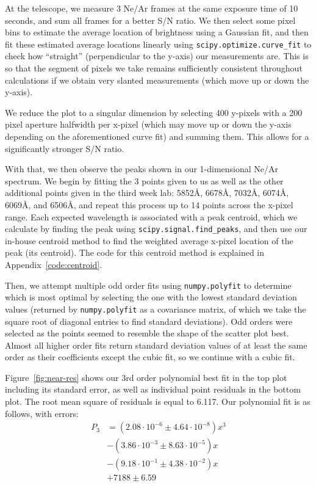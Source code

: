 \documentclass[twocolumn]{aastex702}
\begin{document}
			At the telescope, we measure 3 Ne/Ar frames at the same exposure time of 10 seconds, and sum all frames for a better S/N ratio. We then select some pixel bins to estimate the average location of brightness using a Gaussian fit, and then fit these estimated average locations linearly using \texttt{scipy.optimize.curve\_fit} to check how ``straight'' (perpendicular to the y-axis) our measurements are. This is so that the segment of pixels we take remains sufficiently consistent throughout calculations if we obtain very slanted measurements (which move up or down the y-axis).
			
			We reduce the plot to a singular dimension by selecting 400 y-pixels with a 200 pixel aperture halfwidth per x-pixel (which may move up or down the y-axis depending on the aforementioned curve fit) and summing them. This allows for a significantly stronger S/N ratio.
			
			With that, we then observe the peaks shown in our 1-dimensional Ne/Ar spectrum. We begin by fitting the 3 points given to us as well as the other additional points given in the third week lab: 5852Å, 6678Å, 7032Å, 6074Å, 6069Å, and 6506Å, and repeat this process up to 14 points across the x-pixel range. Each expected wavelength is associated with a peak centroid, which we calculate by finding the peak using \texttt{scipy.signal.find\_peaks}, and then use our in-house centroid method to find the weighted average x-pixel location of the peak (its centroid). The code for this centroid method is explained in Appendix~\ref{code:centroid}.
			
			Then, we attempt multiple odd order fits using \texttt{numpy.polyfit} to determine which is most optimal by selecting the one with the lowest standard deviation values (returned by \texttt{numpy.polyfit} as a covariance matrix, of which we take the square root of diagonal entries to find standard deviations). Odd orders were selected as the points seemed to resemble the shape of the scatter plot best. Almost all higher order fits return standard deviation values of at least the same order as their coefficients except the cubic fit, so we continue with a cubic fit.
			
			Figure~\ref{fig:near-res} shows our 3rd order polynomial best fit in the top plot including its standard error, as well as individual point residuals in the bottom plot. The root mean square of residuals is equal to 6.117. Our polynomial fit is as follows, with errors:
			\begin{equation}\label{eq:telescope-fit}
				\begin{split}
				P_3 & = (2.08 \cdot 10 ^{-6} \pm 4.64 \cdot 10^{-8}) x^3 \\
				& - (3.86 \cdot 10^{-3} \pm 8.63 \cdot 10^{-5}) x \\
				& - (9.18 \cdot 10^{-1} \pm 4.38 \cdot 10^{-2}) x \\
				& + 7188 \pm 6.59
				\end{split}
			\end{equation}
			
\end{document}
